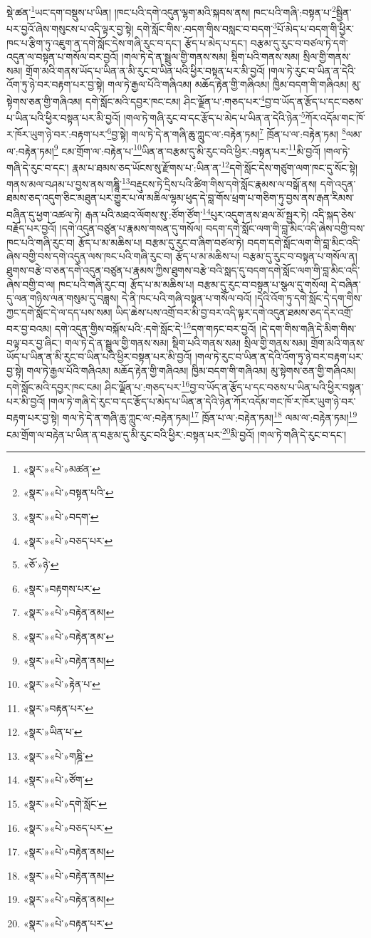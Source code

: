 སྡེ་ཚན་\footnote{«སྣར་»«པེ་»མཚན་}ཡང་དག་བསྡུས་པ་ཡིན། །ཁང་པའི་དགེ་འདུན་ལྷག་མའི་སྐབས་ནས། ཁང་པའི་གཞི་:བསྟན་པ་\footnote{«སྣར་»«པེ་»བསྟན་པའི་}སྦྱིན་པར་བྱའོ་ཞེས་གསུངས་པ་འདི་ལྟར་བྱ་སྟེ། དགེ་སློང་གིས་:བདག་གིས་བསླང་བ་བདག་\footnote{«སྣར་»«པེ་»བདག་}པོ་མེད་པ་བདག་གི་ཕྱིར་ཁང་པ་རྩིག་ཏུ་འཇུག་ན་དགེ་སློང་དེས་གཞི་རུང་བ་དང་། རྩོད་པ་མེད་པ་དང་། བརྩམ་དུ་རུང་བ་བཙལ་ཏེ་དགེ་འདུན་ལ་བསྟན་པ་གསོལ་བར་བྱའོ། །གལ་ཏེ་དེ་ན་སྦྲུལ་གྱི་གནས་སམ། སྡིག་པའི་གནས་སམ། སྲིལ་གྱི་གནས་སམ། གྲོག་མའི་གནས་ཡོད་པ་ཡིན་ན་མི་རུང་བ་ཡིན་པའི་ཕྱིར་བསྟན་པར་མི་བྱའོ། །གལ་ཏེ་རུང་བ་ཡིན་ན་དེའི་འོག་ཏུ་ཉེ་བར་བརྟག་པར་བྱ་སྟེ། གལ་ཏེ་རྒྱལ་པོའི་གཞིའམ། མཆོད་རྟེན་གྱི་གཞིའམ། ཁྱིམ་བདག་གི་གཞིའམ། མུ་སྟེགས་ཅན་གྱི་གཞིའམ། དགེ་སློང་མའི་དབྱར་ཁང་ངམ། ཤིང་ལྗོན་པ་:གཅད་པར་\footnote{«སྣར་»«པེ་»བཅད་པར་}བྱ་བ་ཡོད་ན་རྩོད་པ་དང་བཅས་པ་ཡིན་པའི་ཕྱིར་བསྟན་པར་མི་བྱའོ། །གལ་ཏེ་གཞི་རུང་བ་དང་རྩོད་པ་མེད་པ་ཡིན་ན་དེའི་ཉེན་\footnote{«ཅོ་»ཉེ་}ཀོར་འདོམ་གང་ཁོ་ར་ཁོར་ཡུག་ཉེ་བར་:བརྟག་པར་\footnote{«སྣར་»བརྟགས་པར་}བྱ་སྟེ། གལ་ཏེ་དེ་ན་གཞི་ཆུ་ཀླུང་ལ་:བརྟེན་ཏམ།\footnote{«སྣར་»«པེ་»བརྟེན་ནམ།} ཁྲོན་པ་ལ་:བརྟེན་ཏམ། \footnote{«སྣར་»«པེ་»བརྟེན་ནམ་}ལམ་ལ་:བརྟེན་ཏམ།\footnote{«སྣར་»«པེ་»བརྟེན་ནམ།} ངམ་གྲོག་ལ་:བརྟེན་པ་\footnote{«སྣར་»«པེ་»རྟེན་པ་}ཡིན་ན་བརྩམ་དུ་མི་རུང་བའི་ཕྱིར་:བསྟན་པར་\footnote{«སྣར་»བརྟན་པར་}མི་བྱའོ། །གལ་ཏེ་གཞི་དེ་རུང་བ་དང་། རྣམ་པ་ཐམས་ཅད་ཡོངས་སུ་རྫོགས་པ་:ཡིན་ན་\footnote{«སྣར་»ཡིན་པ་}དགེ་སློང་དེས་གཙུག་ལག་ཁང་དུ་སོང་སྟེ། གནས་མལ་བཤམ་པ་བྱས་ནས་གཎྜཱི་\footnote{«སྣར་»«པེ་»གཎྜི་}བརྡུངས་ཏེ་དྲིས་པའི་ཚིག་གིས་དགེ་སློང་རྣམས་ལ་བསྒོ་ནས། དགེ་འདུན་ཐམས་ཅད་འདུག་ཅིང་མཐུན་པར་གྱུར་པ་ལ་མཆིལ་ལྷམ་ཕུད་དེ་བླ་གོས་ཕྲག་པ་གཅིག་ཏུ་བྱས་ནས་རྒན་རིམས་བཞིན་དུ་ཕྱག་འཚལ་ཏེ། རྒན་པའི་མཐའ་ལོགས་སུ་:ཙོག་ཙོག་\footnote{«སྣར་»«པེ་»ཙོག་}པུར་འདུག་ནས་ཐལ་མོ་སྦྱར་ཏེ། འདི་སྐད་ཅེས་བརྗོད་པར་བྱའོ། །དགེ་འདུན་བཙུན་པ་རྣམས་གསན་དུ་གསོལ། བདག་དགེ་སློང་ལག་གི་བླ་མིང་འདི་ཞེས་བགྱི་བས་ཁང་པའི་གཞི་རུང་བ། རྩོད་པ་མ་མཆིས་པ། བརྩམ་དུ་རུང་བ་ཞིག་བཙལ་ཏེ། བདག་དགེ་སློང་ལག་གི་བླ་མིང་འདི་ཞེས་བགྱི་བས་དགེ་འདུན་ལས་ཁང་པའི་གཞི་རུང་བ། རྩོད་པ་མ་མཆིས་པ། བརྩམ་དུ་རུང་བ་བསྟན་པ་གསོལ་ན། ཐུགས་བརྩེ་བ་ཅན་དགེ་འདུན་བཙུན་པ་རྣམས་ཀྱིས་ཐུགས་བརྩེ་བའི་སླད་དུ་བདག་དགེ་སློང་ལག་གི་བླ་མིང་འདི་ཞེས་བགྱི་བ་ལ། ཁང་པའི་གཞི་རུང་བ། རྩོད་པ་མ་མཆིས་པ། བརྩམ་དུ་རུང་བ་བསྟན་པ་སྩལ་དུ་གསོལ། དེ་བཞིན་དུ་ལན་གཉིས་ལན་གསུམ་དུ་བཟླས། དེ་ནི་ཁང་པའི་གཞི་བསྟན་པ་གསོལ་བའོ། །དེའི་འོག་ཏུ་དགེ་སློང་དེ་དག་གིས་ཀྱང་དགེ་སློང་དེ་ལ་དད་པས་སམ། ཡིད་ཆེས་པས་འགྲོ་བར་མི་བྱ་བར་འདི་ལྟར་དགེ་འདུན་ཐམས་ཅད་དེར་འགྲོ་བར་བྱ་བའམ། དགེ་འདུན་གྱིས་བསྐོས་པའི་:དགེ་སློང་དེ་\footnote{«སྣར་»«པེ་»དགེ་སློང་}དག་གཏང་བར་བྱའོ། །དེ་དག་གིས་གཞི་དེ་མིག་གིས་བལྟ་བར་བྱ་ཞིང་། གལ་ཏེ་དེ་ན་སྦྲུལ་གྱི་གནས་སམ། སྡིག་པའི་གནས་སམ། སྲིལ་གྱི་གནས་སམ། གྲོག་མའི་གནས་ཡོད་པ་ཡིན་ན་མི་རུང་བ་ཡིན་པའི་ཕྱིར་བསྟན་པར་མི་བྱའོ། །གལ་ཏེ་རུང་བ་ཡིན་ན་དེའི་འོག་ཏུ་ཉེ་བར་བརྟག་པར་བྱ་སྟེ། གལ་ཏེ་རྒྱལ་པོའི་གཞིའམ། མཆོད་རྟེན་གྱི་གཞིའམ། ཁྱིམ་བདག་གི་གཞིའམ། མུ་སྟེགས་ཅན་གྱི་གཞིའམ། དགེ་སློང་མའི་དབྱར་ཁང་ངམ། ཤིང་ལྗོན་པ་:གཅད་པར་\footnote{«སྣར་»«པེ་»བཅད་པར་}བྱ་བ་ཡོད་ན་རྩོད་པ་དང་བཅས་པ་ཡིན་པའི་ཕྱིར་བསྟན་པར་མི་བྱའོ། །གལ་ཏེ་གཞི་དེ་རུང་བ་དང་རྩོད་པ་མེད་པ་ཡིན་ན་དེའི་ཉེན་ཀོར་འདོམ་གང་ཁོ་ར་ཁོར་ཡུག་ཉེ་བར་བརྟག་པར་བྱ་སྟེ། གལ་ཏེ་དེ་ན་གཞི་ཆུ་ཀླུང་ལ་:བརྟེན་ཏམ།\footnote{«སྣར་»«པེ་»བརྟེན་ནམ།} ཁྲོན་པ་ལ་:བརྟེན་ཏམ།\footnote{«སྣར་»«པེ་»བརྟེན་ནམ།} ལམ་ལ་:བརྟེན་ཏམ།\footnote{«སྣར་»«པེ་»བརྟེན་ནམ།} ངམ་གྲོག་ལ་བརྟེན་པ་ཡིན་ན་བརྩམ་དུ་མི་རུང་བའི་ཕྱིར་:བསྟན་པར་\footnote{«སྣར་»«པེ་»བརྟན་པར་}མི་བྱའོ། །གལ་ཏེ་གཞི་དེ་རུང་བ་དང་། 